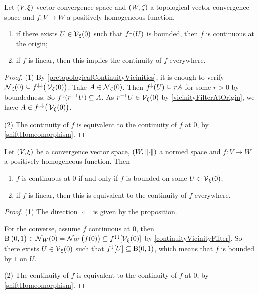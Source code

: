 \begin{proposition} \label{boundedOnVicinityImpliesContinuous}
Let $\left( V,\xi \right)$ vector convergence space and $\left( W,\zeta \right)$ a topological vector convergence space and $f: V\to W$ a positively homogeneous function.
\begin{enumerate}
\item if there exists $U\in \operatorname{\mathcal{V}}_\xi(0)$ such that $f^\downarrow(U)$ is bounded, then $f$ is continuous at the origin;
\item if $f$ is linear, then this implies the continuity of $f$ everywhere.
\end{enumerate}
\end{proposition}
\begin{proof}
(1) By \ref{pretopologicalContinuityVicinities}, it is enough to verify $\operatorname{\mathcal{N}}_\zeta(0) \subseteq f^{\downarrow\downarrow}\big(\operatorname{\mathcal{V}}_\xi(0)\big)$. Take $A\in \operatorname{\mathcal{N}}_\zeta(0)$. Then $f^\downarrow(U)\subseteq rA$ for some $r>0$ by boundedness. So $f^\downarrow(r^{-1}U) \subseteq A$. As $r^{-1}U\in \operatorname{\mathcal{V}}_\xi(0)$ by \ref{vicinityFilterAtOrigin}, we have $A \in f^{\downarrow\downarrow}\big(\operatorname{\mathcal{V}}_\xi(0)\big)$.

(2) The continuity of $f$ is equivalent to the continuity of $f$ at $0$, by \ref{shiftHomeomorphism}.
\end{proof}
\begin{corollary} \label{continuityToNormedSpace}
Let $\left( V, \xi \right)$ be a convergence vector space, $\left( W, \lVert\cdot\rVert \right)$ a normed space and $f: V\to W$ a positively homogeneous function. Then
\begin{enumerate}
\item $f$ is continuous at $0$ \textup{if and only if} $f$ is bounded on some $U\in \operatorname{\mathcal{V}}_\xi(0)$;
\item if $f$ is linear, then this is equivalent to the continuity of $f$ everywhere.
\end{enumerate}
\end{corollary}
\begin{proof}
(1) The direction $\Leftarrow$ is given by the proposition.

For the converse, assume $f$ continuous at $0$, then $\operatorname{B}\big(0,1\big)\in \operatorname{\mathcal{N}}_W(0) = \operatorname{\mathcal{N}}_W\big(f(0)\big) \subseteq f^{\downarrow\downarrow}[\operatorname{\mathcal{V}}_\xi(0)]$ by \ref{continuityVicinityFilter}. So there exists $U\in \operatorname{\mathcal{V}}_\xi(0)$ such that $f^{\downarrow}[U] \subseteq \operatorname{B}(0,1)$, which means that $f$ is bounded by $1$ on $U$.

(2) The continuity of $f$ is equivalent to the continuity of $f$ at $0$, by \ref{shiftHomeomorphism}.
\end{proof}


